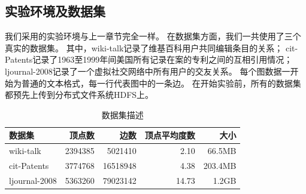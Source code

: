\documentclass[master]{njuthesis}
\begin{document}
\subsection{实验环境及数据集}
我们采用的实验环境与上一章节完全一样。
在数据集方面，我们一共使用了三个真实的数据集。
其中，wiki-talk记录了维基百科用户共同编辑条目的关系；
cit-Patents记录了1963至1999年间美国所有记录在案的专利之间的互相引用情况；
ljournal-2008记录了一个虚拟社交网络中所有用户的交友关系。
每个图数据一开始为普通的文本格式，每一行代表图中的一条边。
在开始实验前，所有的数据集都预先上传到分布式文件系统HDFS上。
\begin{table}[h]
\caption{数据集描述}
\label{tab:dataset2}
\centering
\begin{tabular}{|l|r|r|r|r|}
\hline
\textbf{数据集} & \textbf{顶点数} & \textbf{边数} & \textbf{顶点平均度数} & \textbf{大小} \\
\hline
wiki-talk     \footnotemark[1]       & \num{2394385} & \num{5021410}          &\num{2.10}                   & 66.5MB\\
\hline
cit-Patents      \footnotemark[2]     & \num{3774768}  & \num{16518948 }          & \num{4.38}             & 203.4MB\\
\hline
ljournal-2008  \footnotemark[3] & \num{5363260} & \num{79023142}         & \num{14.73}            &1.2GB\\
\hline
\end{tabular}
\end{table}
\end{document}
